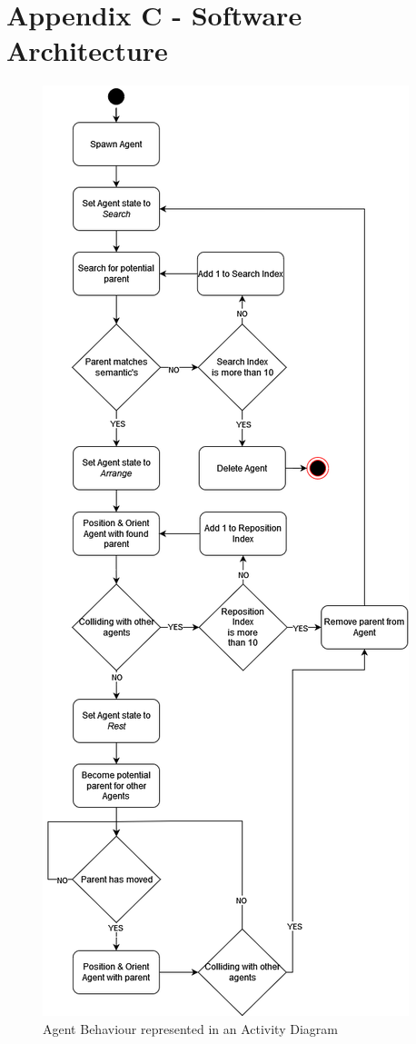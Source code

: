 \newpage
\section*{Appendix C - Software Architecture} \label{append:c}
\begin{figure}[!h]
    \includegraphics[width=\columnwidth]{./Images/AgentActivityDiagram.png}
    \centering
    \caption{Agent Behaviour represented in an Activity Diagram}
    \label{activity-diagram}
\end{figure}


